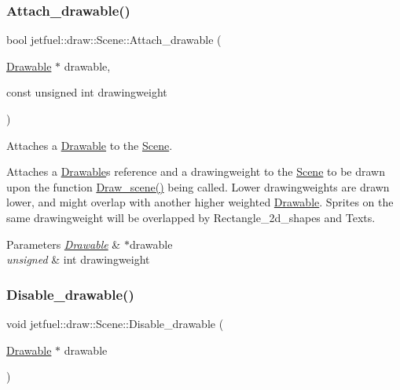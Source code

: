\subsubsection{\texorpdfstring{Attach\+\_\+drawable()}{Attach\_drawable()}}
{\footnotesize\ttfamily bool jetfuel\+::draw\+::\+Scene\+::\+Attach\+\_\+drawable (\begin{DoxyParamCaption}\item[{\hyperlink{classjetfuel_1_1draw_1_1Drawable}{Drawable} $\ast$}]{drawable,  }\item[{const unsigned int}]{drawingweight }\end{DoxyParamCaption})}



Attaches a \hyperlink{classjetfuel_1_1draw_1_1Drawable}{Drawable} to the \hyperlink{classjetfuel_1_1draw_1_1Scene}{Scene}. 

Attaches a \hyperlink{classjetfuel_1_1draw_1_1Drawable}{Drawable}\textquotesingle{}s reference and a drawingweight to the \hyperlink{classjetfuel_1_1draw_1_1Scene}{Scene} to be drawn upon the function \hyperlink{classjetfuel_1_1draw_1_1Scene_a80b9b5f38022b6c2af9921656f93056b}{Draw\+\_\+scene()} being called. Lower drawingweights are drawn lower, and might overlap with another higher weighted \hyperlink{classjetfuel_1_1draw_1_1Drawable}{Drawable}. Sprites on the same drawingweight will be overlapped by Rectangle\+\_\+2d\+\_\+shapes and Texts.


\begin{DoxyParams}{Parameters}
{\em \hyperlink{classjetfuel_1_1draw_1_1Drawable}{Drawable}} & $\ast$drawable \\
\hline
{\em unsigned} & int drawingweight \\
\hline
\end{DoxyParams}
\mbox{\label{classjetfuel_1_1draw_1_1Scene_ab7bf5496c18d4a00e0b5ce02a203a4b4}} 
\subsubsection{\texorpdfstring{Disable\+\_\+drawable()}{Disable\_drawable()}}
{\footnotesize\ttfamily void jetfuel\+::draw\+::\+Scene\+::\+Disable\+\_\+drawable (\begin{DoxyParamCaption}\item[{\hyperlink{classjetfuel_1_1draw_1_1Drawable}{Drawable} $\ast$}]{drawable }\end{DoxyParamCaption})}



